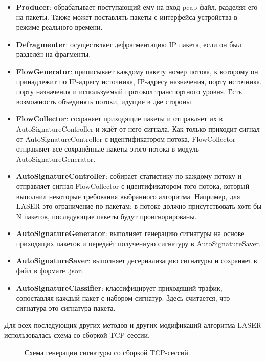\begin{itemize}
    \item \textbf{Producer}: обрабатывает поступающий ему на вход pcap-файл, разделяя его на пакеты.
    Также может поставлять пакеты с интерфейса устройства в режиме реального времени.
    \item \textbf{Defragmenter}: осуществляет дефрагментацию IP пакета, если он был разделён на фрагменты.
    \item \textbf{FlowGenerator}: приписывает каждому пакету номер потока, к которому он принадлежит по
    IP-адресу источника, IP-адресу назначения, порту источника, порту назначения и используемый протокол транспортного уровня. Есть возможность объединять потоки, идущие в две стороны.
    \item \textbf{FlowCollector}: сохраняет приходящие пакеты и отправляет их в AutoSignatureController и ждёт от него сигнала.
    Как только приходит сигнал от AutoSignatureController с идентификатором потока, FlowCollector отправляет все сохранённые пакеты этого потока в модуль AutoSignatureGenerator.
    \item \textbf{AutoSignatureController}: собирает статистику по каждому потоку и отправляет сигнал FlowCollector с идентификатором того потока,
    который выполнил некоторые требования выбранного алгоритма.
    Например, для LASER это ограничение по пакетам: в потоке должно присутствовать хотя бы N пакетов, последующие пакеты будут проигнорированы.
    \item \textbf{AutoSignatureGenerator}: выполняет генерацию сигнатуры на основе приходящих пакетов и передаёт полученную сигнатуру в AutoSignatureSaver.
    \item \textbf{AutoSignatureSaver}: выполняет десериализацию сигнатуры и сохраняет в файл в формате .json.
    \item \textbf{AutoSignatureClassifier}: классифицирует приходящий трафик, сопоставляя каждый пакет с набором сигнатур. Здесь считается, что сигнатура это сигнатура-пакета.
\end{itemize}

Для всех последующих других методов и других модификаций алгоритма LASER использовалась схема со сборкой TCP-сессии.

\begin{figure}[H]
    \begin{center}
        
        \caption{Схема генерации сигнатуры со сборкой TCP-сессий.}
    \end{center}
\end{figure}

